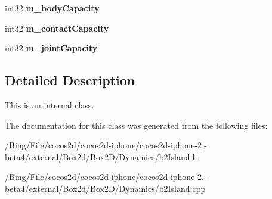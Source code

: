 \begin{DoxyCompactItemize}
\item 
\hypertarget{classb2_island_a5ea371889bb93fb6387ff2ab427191ed}{int32 {\bfseries m\-\_\-body\-Capacity}}\label{classb2_island_a5ea371889bb93fb6387ff2ab427191ed}

\item 
\hypertarget{classb2_island_a1a65b8fc8256ca443f85e6ae6f2d841a}{int32 {\bfseries m\-\_\-contact\-Capacity}}\label{classb2_island_a1a65b8fc8256ca443f85e6ae6f2d841a}

\item 
\hypertarget{classb2_island_a9b6e63c89307d469e1075585d65a9bbb}{int32 {\bfseries m\-\_\-joint\-Capacity}}\label{classb2_island_a9b6e63c89307d469e1075585d65a9bbb}

\end{DoxyCompactItemize}


\subsection{Detailed Description}
This is an internal class. 

The documentation for this class was generated from the following files\-:\begin{DoxyCompactItemize}
\item 
/\-Bing/\-File/cocos2d/cocos2d-\/iphone/cocos2d-\/iphone-\/2.-\/beta4/external/\-Box2d/\-Box2\-D/\-Dynamics/b2\-Island.\-h\item 
/\-Bing/\-File/cocos2d/cocos2d-\/iphone/cocos2d-\/iphone-\/2.-\/beta4/external/\-Box2d/\-Box2\-D/\-Dynamics/b2\-Island.\-cpp\end{DoxyCompactItemize}
